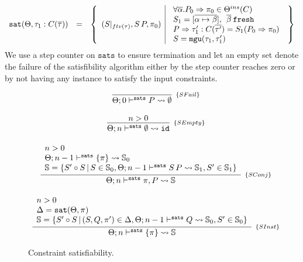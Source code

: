 \documentclass[a4paper, 11pt]{article}
\theoremstyle{definition}
\begin{document}
\[
  \begin{array}{lcl}
    \texttt{sat}(\Theta,\tau_1 : C(\overline{\tau})) & = & \left\{\begin{array}{l|l} 
                                (S|_{ftv(\tau)}, S\,P, \pi_0) & 
                                  \begin{array}{l}
                                    \forall\overline{\alpha} . P_0 \Rightarrow \pi_0 \in \Theta^{ins}(C) \\ 
                                    S_1 = [\overline{\alpha\mapsto\beta}],\:\:\overline{\beta}\:\mathtt{fresh}\\ 
                                    P \Rightarrow \tau'_1 : C(\overline{\tau'}) = S_1(P_0\Rightarrow \pi_0)\\ 
                                    S = \mathtt{mgu}(\tau_1, \tau'_1)\\
                                  \end{array}
                             \end{array}\right\}
  \end{array}
\]
We use a step counter on $\mathtt{sats}$ to ensure termination and let 
an empty set denote the failure of the satisfibility algorithm either 
by the step counter reaches zero or by not having any instance to 
satisfy the input constraints.

\begin{figure}[H] 
  \[
    \begin{array}{c}
      \infer[_{\{SFail\}}]
            {\sats{P}{\emptyset}{0}} 
            {}
      \\ \\ 
      \infer[_{\{SEmpty\}}]
            {\sats{\emptyset}{\id}{n}}
            {n > 0}
      \\ \\ 
      \infer[_{\{SConj\}}]
            {\sats{\pi , P}{\mathbb{S}}{n}} 
            {\begin{array}{l}
              n > 0\\
              \sats{\{\pi\}}{\mathbb{S}_0}{n - 1}\\
              \mathbb{S} = \{S'\circ S\,|\,S \in \mathbb{S}_0, \sats{S\,P}{\mathbb{S}_1}{n - 1}, S' \in \mathbb{S}_1\}
             \end{array}}
      \\ \\ 
      \infer[_{\{SInst\}}] 
            {\sats{\{\pi\}}{\mathbb{S}}{n}}
            {\begin{array}{l}
              n > 0 \\ 
              \Delta = \mathtt{sat}(\Theta,\pi)\\
              \mathbb{S} = \{S'\circ S\,|\,(S,Q,\pi')\in\Delta, \sats{Q}{\mathbb{S}_0}{n - 1}, S' \in \mathbb{S}_0\}
             \end{array}}
    \end{array}
  \]
  \caption{Constraint satisfiability.}
  \label{fig:sat-algorithm}
\end{figure}
\end{document}
